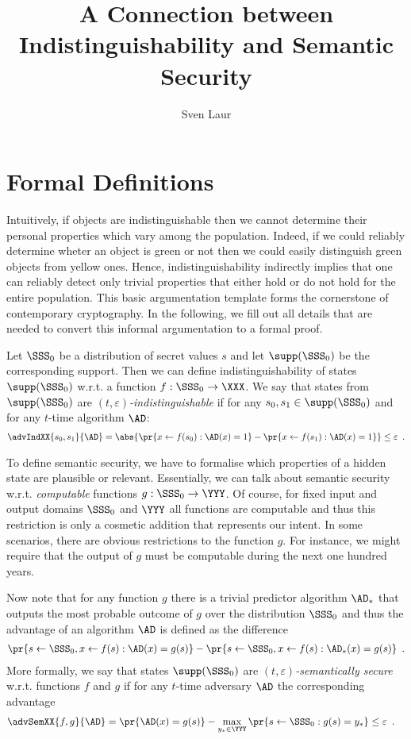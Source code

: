 \documentclass{llncs}
\title{A Connection between Indistinguishability and Semantic Security}
\author{Sven Laur}
\institute{University of Tartu}
\begin{document}
\maketitle

\section{Formal Definitions}

Intuitively, if objects are indistinguishable then we cannot determine
their personal properties which vary among the population. Indeed, if
we could reliably determine wheter an object is green or not then we
could easily distinguish green objects from yellow ones. Hence,
indistinguishability indirectly implies that one can reliably detect
only trivial properties that either hold or do not hold for the entire
population. This basic argumentation template forms the cornerstone of
contemporary cryptography. In the following, we fill out all details
that are needed to convert this informal argumentation to a formal
proof.

Let $\SSS_0$ be a distribution of secret values $s$ and let
$\supp(\SSS_0)$ be the corresponding support.  Then we can define
indistinguishability of states $\supp(\SSS_0)$ w.r.t. a function
$f:\SSS_0\to\XXX$. We say that states from $\supp(\SSS_0)$ are
\emph{$(t,\varepsilon)$-indistinguishable} if for any
$s_0,s_1\in\supp(\SSS_0)$ and for any $t$-time algorithm $\AD$:
\begin{align*}
  \advIndXX{s_0,s_1}{\AD}%
  =\abs{\pr{x\gets f(s_0):\AD(x)=1}-\pr{x\gets f(s_1):\AD(x)=1}}%
  \leq \varepsilon\enspace.
\end{align*}

To define semantic security, we have to formalise which properties of
a hidden state are plausible or relevant. Essentially, we can talk
about semantic security w.r.t. \emph{computable} functions
$g:\SSS_0\to\YYY$. Of course, for fixed input and output domains
$\SSS_0$ and $\YYY$ all functions are computable and thus this
restriction is only a cosmetic addition that represents our intent. In
some scenarios, there are obvious restrictions to the function
$g$. For instance, we might require that the output of $g$ must be
computable during the next one hundred years. 

Now note that for any function $g$ there is a trivial predictor
algorithm $\AD_*$ that outputs the most probable outcome of $g$ over
the distribution $\SSS_0$ and thus the advantage of an algorithm $\AD$
is defined as the difference
\begin{align*}
  \pr{s\gets\SSS_0, x\gets f(s): \AD(x)=g(s)}-
  \pr{s\gets\SSS_0, x\gets f(s): \AD_*(x)=g(s)}\enspace.
\end{align*}
More formally, we say that states $\supp(\SSS_0)$ are
\emph{$(t,\varepsilon)$-semantically secure} w.r.t. functions $f$ and
$g$ if for any $t$-time adversary $\AD$ the corresponding advantage
 \begin{align*}
   \advSemXX{f,g}{\AD}%
   &=\pr{ \AD(x)=g(s)}
   -\max_{y_*\in\YYY}\pr{s\gets\SSS_0:g(s)=y_*}\leq\varepsilon\enspace.
\end{align*}
\end{document}
